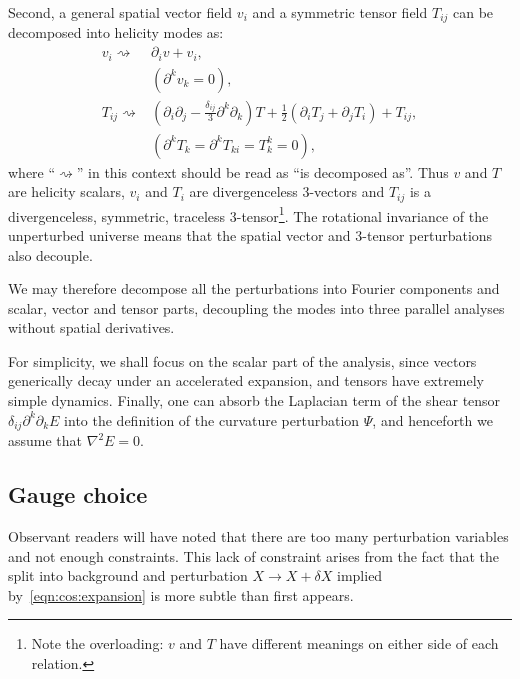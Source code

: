 Second, a general spatial vector field \(v_i\) and a symmetric tensor field \(T_{ij}\) can be decomposed into helicity modes as:
\begin{align}
  v_i \rightsquigarrow& \partial_i v + v_i,   \nonumber\\
  &(\partial^k v_k=0), \\
  T_{ij} \rightsquigarrow& (\partial_i\partial_j - \frac{\delta_{ij}}{3}\partial^k\partial_k)T + \frac{1}{2}(\partial_i T_j + \partial_j T_i) + T_{ij} \nonumber,\\ 
  &(\partial^k T_k = \partial^k T_{ki} = T^k_k = 0),
\end{align}
where ``\(\rightsquigarrow\)'' in this context should be read as ``is decomposed as''.
Thus \(v\) and \(T\) are helicity scalars, \(v_i\) and \(T_i\) are divergenceless 3-vectors and \(T_{ij}\) is a divergenceless, symmetric, traceless 3-tensor\footnote{Note the overloading: \(v\) and \(T\) have different meanings on either side of each relation.}.
  The rotational invariance of the unperturbed universe means that the spatial vector and 3-tensor perturbations also decouple.

We may therefore decompose all the perturbations into Fourier components and scalar, vector and tensor parts, decoupling the modes into three parallel analyses without spatial derivatives.

For simplicity, we shall focus on the scalar part of the analysis, since vectors generically decay under an accelerated expansion, and tensors have extremely simple dynamics. Finally, one can absorb the Laplacian term of the shear tensor \(\delta_{ij}\partial^k\partial_k E\) into the definition of the curvature perturbation \(\Psi\), and henceforth we assume that \(\nabla^2 E = 0\).

\subsection{Gauge choice}
Observant readers will have noted that there are too many perturbation variables and not enough constraints.
This lack of constraint arises from the fact that the split into background and perturbation \(X\to X+\delta X\) implied by~\eqref{eqn:cos:expansion} is more subtle than first appears. 

